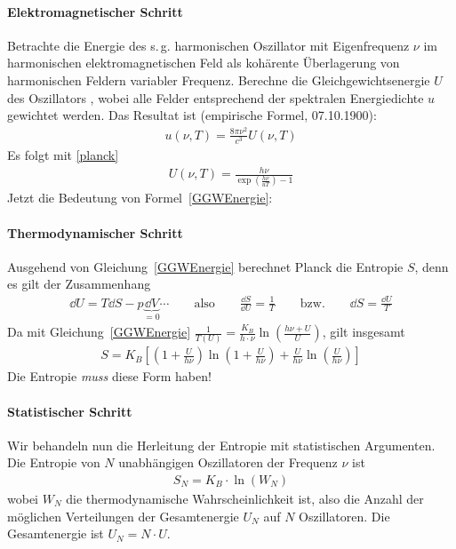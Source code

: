 
\paragraph{Elektromagnetischer Schritt}
Betrachte die Energie des s.\,g. harmonischen Oszillator mit
Eigenfrequenz $\nu$ im harmonischen elektromagnetischen Feld
als kohärente Überlagerung von harmonischen Feldern variabler
Frequenz.
Berechne die Gleichgewichtsenergie $U$ des Oszillators%
, wobei
alle Felder entsprechend der spektralen Energiedichte $u$ gewichtet
werden.
Das Resultat ist (empirische Formel, 07.10.1900):
\begin{gather*}
  u(\nu, T) = \frac{8\pi\nu^2}{c^3} U(\nu, T)
\end{gather*}
Es folgt mit \eqref{planck}
\begin{gather}
  U(\nu, T) = \frac{h\nu}{\exp(\frac{h\nu}{uT}) - 1}
  \label{GGWEnergie}
\end{gather}
Jetzt die Bedeutung von Formel~\eqref{GGWEnergie}:

\paragraph{Thermodynamischer Schritt}
Ausgehend von Gleichung~\eqref{GGWEnergie} berechnet Planck die
Entropie $S$, denn es gilt der Zusammenhang
\begin{gather*}
  \dd U = T\dd S - p\underbrace{\dd V}_{=0} \dotsb
  \qquad\text{also} \qquad
  \frac{\dd S}{\dd U} = \frac{1}{T}
  \qquad\text{bzw.} \qquad
  \dd S = \frac{\dd U}{T} 
\end{gather*}
Da mit Gleichung~\eqref{GGWEnergie}
$\frac{1}{T(U)} = \frac{K_B}{h\cdot\nu}\ln\left(\frac{h\nu+U}{U}\right)$,
gilt insgesamt
\begin{gather*}
  S = K_B \left[ 
    \left(1+\frac{U}{h\nu}\right) \ln\left(1+\frac{U}{h\nu}\right)
    + \frac{U}{h\nu}\ln\left(\frac{U}{h\nu}\right)
  \right]
\end{gather*}
Die Entropie \emph{muss} diese Form haben!

\paragraph{Statistischer Schritt}
Wir behandeln nun die Herleitung der Entropie mit statistischen
Argumenten.
Die Entropie von $N$ unabhängigen Oszillatoren der Frequenz $\nu$
ist
\begin{gather*}
  S_N = K_B\cdot \ln(W_N)
\end{gather*}
wobei $W_N$
die thermodynamische Wahrscheinlichkeit ist, also die Anzahl der
möglichen Verteilungen der Gesamtenergie $U_N$ auf $N$ Oszillatoren.
Die Gesamtenergie ist $U_N=N\cdot
U$.

